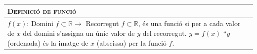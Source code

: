 \newpage
	\vspace*{-0.25cm}
\begin{center}
		\vspace{-0.4cm}
	\setlength\LTleft{0pt}
	\setlength\LTright{0pt}
	\fontsize{10.5}{11}
	\begin{longtable}[h]{|p{}|}
		\hline %
		\rowcolor{lightgray} \textbf{\textsc{Definició de funció}} \\   [0.5ex]   \hline
		$f(x)$: Domini $f \subset \mathbb{R} \rightarrow$ Recorregut $f\subset \mathbb{R}$, és una funció si per a cada valor de $x$ del domini s'assigna un únic valor de $y$ del recorregut. $y=f(x)$ ``$y$ (ordenada) és la imatge de $x$ (abscissa) per la funció $f$.\\
		\hline
	\end{longtable}
\end{center}
\vspace{-0.25cm}

